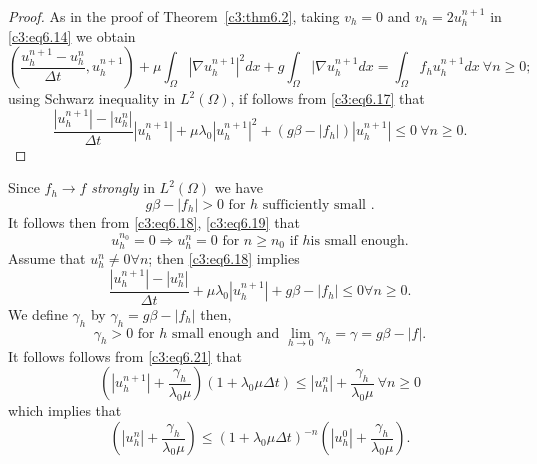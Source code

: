 \begin{proof}
As in the proof of Theorem~\ref{c3:thm6.2}, taking $v_h = 0$ and $v_h = 2u^{n+1}_h$ in \eqref{c3:eq6.14} we obtain
{\fontsize{10}{12}\selectfont
\begin{equation}
\left(\frac{u^{n+1}_h - u^n_h} {\Delta  t}, u^{n+1}_h\right) + \mu
\int_\Omega |\nabla u^{n+1}_h|^2 dx + g \int_\Omega |\nabla u^{n+1}_h
dx = \int_\Omega f_h u^{n+1}_h dx \ \forall n \geq 0;
\tag{6.17}\label{c3:eq6.17} 
\end{equation}}\relax
using Schwarz inequality in $L^2 (\Omega)$, if follows from
\eqref{c3:eq6.17} that 
\begin{equation}
\frac{|u^{n+1}_h | - |u^n_h|} {\Delta  t} |u^{n+1}_h| + \mu \lambda_0
| u^{n+1}_h|^2 + (g \beta - |f_h|) |u^{n+1}_h| \leq 0 \ \forall n \geq
0. \tag{6.18}\label{c3:eq6.18} 
\end{equation}
\end{proof}

Since $f_h \to f$ \textit{ strongly } in $L^2 (\Omega)$ we have
\begin{equation}
 g \beta - |f_h| > 0 \text { for } h  \text { sufficiently small }. \tag{6.19}\label{c3:eq6.19}
\end{equation}
It follows then from \eqref{c3:eq6.18}, \eqref{c3:eq6.19} that
\begin{equation}
u^{n_0}_h = 0 \Rightarrow u^n_h = 0 \text{ for } n \geq n_0 \text{ if } h \text{is small enough}. \tag{6.20}\label{c3:eq6.20}
\end{equation}\pageoriginale 
Assume that $u^n_h \neq 0 \forall n$; then \eqref{c3:eq6.18} implies
\begin{equation}
\frac{|u^{n+1}_h|-|u^n_h|} {\Delta  t} + \mu \lambda_0 |u^{n+1}_h| + g \beta - |f_h| \leq 0 \forall n \geq 0. \tag{6.21}\label{c3:eq6.21}
\end{equation}
We define $\gamma_h$ by $\gamma_h = g \beta - |f_h|$ then,
\begin{equation}
\gamma_h > 0 \text { for } h \text{ small enough and } \lim_{h \to 0}
\gamma_h = \gamma = g \beta - |f|. \tag{6.22}\label{c3:eq6.22} 
\end{equation}
It follows follows from \eqref{c3:eq6.21} that
$$
\left(|u^{n+1}_h| + \frac{\gamma_h}{\lambda_0 \mu}\right) (1+\lambda_0 \mu \Delta
t) \leq |u^n_h| + \frac{\gamma_h}{\lambda_0 \mu} \ \forall n \geq 0 
$$
which implies that
\begin{equation}
\left(|u^n_h| + \frac{\gamma_h}{\lambda_0 \mu}\right) \leq
(1+\lambda_0 \mu \Delta  t)^{-n} \left(|u^0_h| + \frac{\gamma_h}{\lambda_0
  \mu}\right).\tag{6.23}\label{c3:eq6.23} 
\end{equation}

